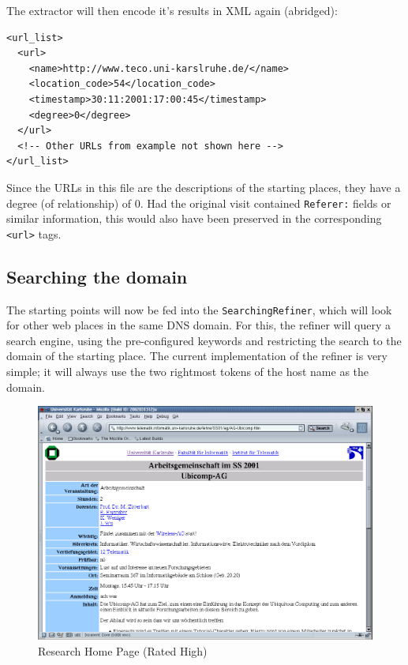 \documentclass[a4paper,twoside]{danarticle}
\theoremstyle{remark}
\begin{document}
      The extractor will then encode it's results in XML again (abridged):
      \begin{verbatim}
<url_list>
  <url> 
    <name>http://www.teco.uni-karslruhe.de/</name> 
    <location_code>54</location_code> 
    <timestamp>30:11:2001:17:00:45</timestamp> 
    <degree>0</degree> 
  </url> 
  <!-- Other URLs from example not shown here --> 
</url_list>
      \end{verbatim}
      Since the URLs in this file are the descriptions of the starting places,
      they have a degree (of relationship) of 0. Had the original visit
      contained
      \verb$Referer:$  fields or similar information, this would also have been
      preserved in the corresponding \verb$<url>$ tags.
    \subsection{Searching the domain}
      The starting points will now be fed into the \verb$SearchingRefiner$,
      which will look for other web places in the same DNS domain. For this, the
      refiner will query a search engine, using the pre-configured keywords and
      restricting the search to the domain of the starting place. The current
      implementation of the refiner is very simple; it will always use the two
      rightmost tokens of the host name as the domain. 
      
      
      
      \begin{figure}[ht]
        \centering
        \includegraphics[width=12cm]{ubicompag}
        \caption{Research Home Page (Rated High)}
        \label{ubicompag}
      \end{figure}
      
\end{document}
